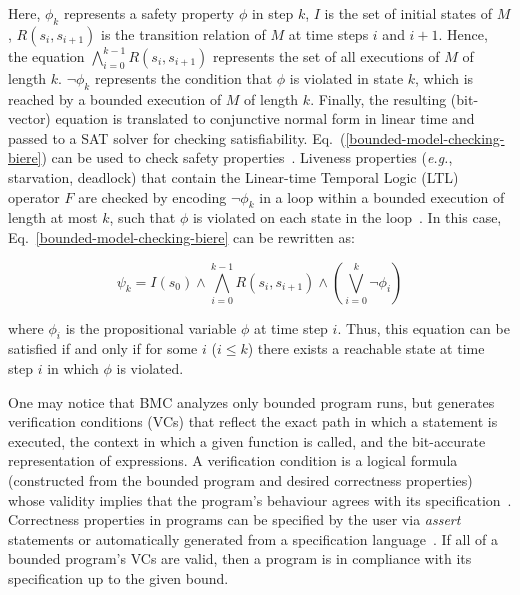 \documentclass[format=acmsmall, review=false, screen=true]{acmart}
\begin{document}
\noindent Here, $\phi_{k}$ represents a safety property $\phi$ in step $k$, $I$ is the set of initial states of $M$, $R\left(s_{i},s_{i+1}\right)$ is the transition relation of $M$ at time steps $i$ and $i+1$. Hence, the equation $\bigwedge^{k-1}_{i=0} R\left(s_{i},s_{i+1}\right)$ represents the set of all executions of $M$ of length $k$. $\neg \phi_{k}$ represents the condition that $\phi$ is violated in state $k$, which is reached by a bounded execution of $M$ of length $k$. Finally, the resulting (bit-vector) equation is translated to conjunctive normal form in linear time and passed to a SAT solver for checking satisfiability. Eq.~(\ref{bounded-model-checking-biere}) can be used to check safety properties~\cite{PrasadBG05}. Liveness properties ({\it e.g.}, starvation, deadlock) that contain the Linear-time Temporal Logic (LTL) operator $F$ are checked by encoding $\neg \phi_{k}$ in a loop within a bounded execution of length at most $k$, such that $\phi$ is violated on each state in the loop~\cite{JMorse15}. In this case, Eq.~\ref{bounded-model-checking-biere} can be rewritten as:

%
\begin{equation}
\psi_{k} = I\left(s_{0}\right) \wedge \bigwedge^{k-1}_{i=0} R\left(s_{i},s_{i+1}\right) \wedge \left(\bigvee^{k}_{i=0} \neg \phi_{i}\right)
\end{equation}

\noindent where $\phi_{i}$ is the propositional variable $\phi$ at time step $i$. Thus, this equation can be satisfied if and only if for some $i$ ($i \leq k$) there exists a reachable state at time step $i$ in which $\phi$ is violated. 

One may notice that BMC analyzes only bounded program runs, but generates verification conditions (VCs) that reflect the exact path in which a statement is executed, the context in which a given function is called, and the bit-accurate representation of expressions. A verification condition is a logical formula (constructed from the bounded program and desired correctness properties) whose validity implies that the program's behaviour agrees with its specification~\cite{Bradley07}. Correctness properties in programs can be specified by the user via \textit{assert} statements or automatically generated from a specification language~\cite{Thomas01}. If all of a bounded program's VCs are valid, then a program is in compliance with its specification up to the given bound.
\end{document}
